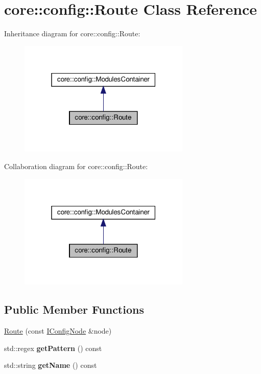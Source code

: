 \hypertarget{classcore_1_1config_1_1Route}{}\section{core\+:\+:config\+:\+:Route Class Reference}
\label{classcore_1_1config_1_1Route}


Inheritance diagram for core\+:\+:config\+:\+:Route\+:
\nopagebreak
\begin{figure}[H]
\begin{center}
\leavevmode
\includegraphics[width=232pt]{classcore_1_1config_1_1Route__inherit__graph}
\end{center}
\end{figure}


Collaboration diagram for core\+:\+:config\+:\+:Route\+:
\nopagebreak
\begin{figure}[H]
\begin{center}
\leavevmode
\includegraphics[width=232pt]{classcore_1_1config_1_1Route__coll__graph}
\end{center}
\end{figure}
\subsection*{Public Member Functions}
\begin{DoxyCompactItemize}
\item 
\hyperlink{classcore_1_1config_1_1Route_ae4cd245ca558e741202ebab6fa13e4e0}{Route} (const \hyperlink{classIConfigNode}{I\+Config\+Node} \&node)
\item 
\mbox{\label{classcore_1_1config_1_1Route_a12fe2266630535ccac80d518eda4dbe4}} 
std\+::regex {\bfseries get\+Pattern} () const
\item 
\mbox{\label{classcore_1_1config_1_1Route_a3aabddfbb1ee78a1e8ed586766a6b936}} 
std\+::string {\bfseries get\+Name} () const
\end{DoxyCompactItemize}
